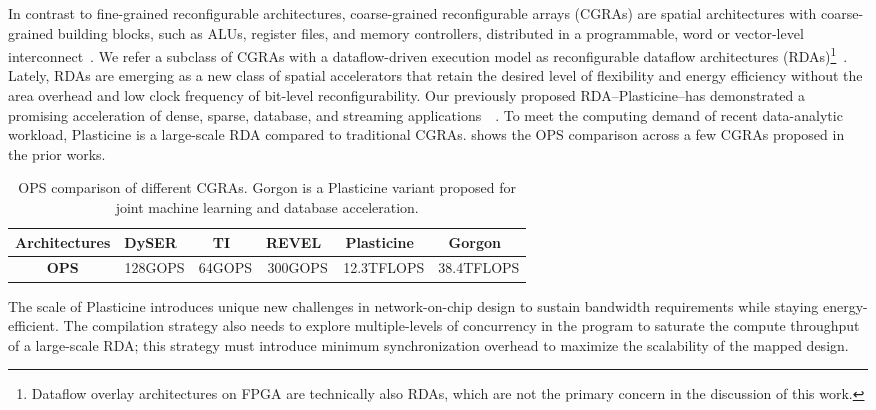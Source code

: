 In contrast to fine-grained reconfigurable architectures,
coarse-grained reconfigurable arrays (CGRAs) are spatial architectures with
coarse-grained building blocks, such as ALUs, register files, and memory controllers,
distributed in a programmable, word or vector-level interconnect~\cite{adres, kress, dyser, piperench, tartan,
hrl, hycube}.
We refer a subclass of CGRAs with a dataflow-driven execution model as reconfigurable dataflow
architectures (RDAs)\footnote{Dataflow overlay architectures on FPGA are technically also RDAs, which are not the primary concern in the discussion of this work.}~\cite{plasticine, ti, streamdataflow,neuflow,cnndataflow,dataflowarch}.
Lately, RDAs are emerging as a new class of spatial accelerators that retain the desired level of
flexibility and energy efficiency without the area overhead and low clock frequency of bit-level reconfigurability.
Our previously proposed RDA--Plasticine--has demonstrated a promising acceleration of dense, sparse, database, and streaming applications~~\cite{plasticine, gorgon, multijoin,prabhakarthesis}.
To meet the computing demand of recent data-analytic workload, Plasticine is a large-scale RDA
compared to traditional CGRAs.
 shows the OPS comparison across a few CGRAs proposed in the prior works.

\begin{table}
  \centering
\begin{tabular*}{0.88\textwidth}{cccccc}
  \toprule
  \textbf{Architectures} & DySER~\cite{dyser} & TI~\cite{ti} & REVEL~\cite{revel}
  & Plasticine~\cite{plasticine} & Gorgon~\cite{gorgon}\\\midrule
  \textbf{OPS} & 128GOPS & 64GOPS & 300GOPS & 12.3TFLOPS & 38.4TFLOPS \\
  \bottomrule
\end{tabular*}
\caption[OPS comparison of different CGRAs]{OPS comparison of different CGRAs. Gorgon is a
Plasticine variant proposed for joint machine learning and database acceleration.}
\label{tab:ops}
\end{table}

The scale of Plasticine introduces unique new challenges in network-on-chip design to sustain
bandwidth requirements while staying energy-efficient.
The compilation strategy also needs to explore multiple-levels of
concurrency in the program to saturate the compute throughput of a large-scale RDA;
this strategy must introduce minimum synchronization overhead to maximize the scalability of the
mapped design.

